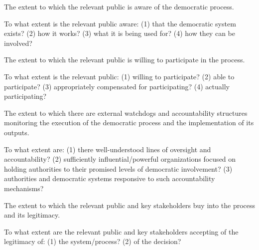     
    \begin{describe}[black]
        The extent to which the relevant public is aware of the democratic process.
    \end{describe}
    \dscplaceholder
    
    \begin{evaluate}[black]
        To what extent is the relevant public aware: (1) that the democratic system exists? (2) how it works? (3) what it is being used for? (4) how they can be involved?
    \end{evaluate}
    \dscplaceholder

    
    \begin{describe}[black]
        The extent to which the relevant public is willing to participate in the process.
    \end{describe}
    \dscplaceholder
    
    \begin{evaluate}[black]
        To what extent is the relevant public: (1) willing to participate? (2) able to participate? (3) appropriately compensated for participating? (4) actually participating?
    \end{evaluate}
    \dscplaceholder
    
    
    \begin{describe}[black]
        The extent to which there are external watchdogs and accountability structures monitoring the execution of the democratic process and the implementation of its outputs.
    \end{describe}
    \dscplaceholder
    
    \begin{evaluate}[black]
        To what extent are: (1) there well-understood lines of oversight and accountability? (2) sufficiently influential/powerful organizations focused on holding authorities to their promised levels of democratic involvement? (3) authorities and democratic systems responsive to such accountability mechanisms?
    \end{evaluate}
    \dscplaceholder
    
    
    \begin{describe}[black]
        The extent to which the relevant public and key stakeholders buy into the process and its legitimacy.
    \end{describe}
    \dscplaceholder
    
    \begin{evaluate}[black]
        To what extent are the relevant public and key stakeholders accepting of the legitimacy of: (1) the system/process? (2) of the decision?
    \end{evaluate}
    \dscplaceholder

\clearpage
